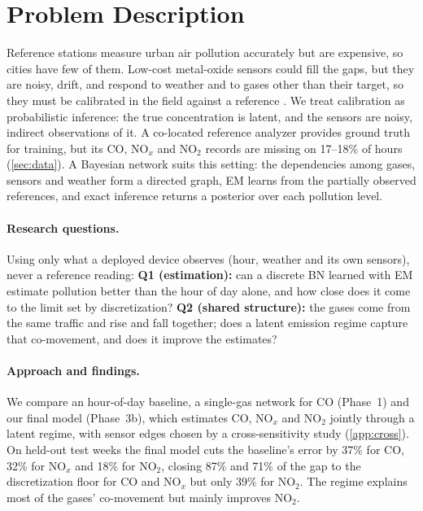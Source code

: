 \section{Problem Description}
\label{sec:problem}

Reference stations measure urban air pollution accurately but are expensive,
so cities have few of them. Low-cost metal-oxide sensors could fill the gaps,
but they are noisy, drift, and respond to weather and to gases other than their
target, so they must be calibrated in the field against a reference
\citep{devito2008calibration}. We treat calibration as probabilistic
inference: the true concentration is latent, and the sensors are noisy,
indirect observations of it. A co-located reference analyzer provides ground
truth for training, but its CO, NO$_x$ and NO$_2$ records are missing on
17--18\% of hours (\cref{sec:data}). A Bayesian network suits this setting:
the dependencies among gases, sensors and weather form a directed graph, EM
\citep{dempster1977em} learns from the partially observed references, and
exact inference returns a posterior over each pollution level.

\paragraph{Research questions.} Using only what a deployed device observes
(hour, weather and its own sensors), never a reference reading:
\textbf{Q1 (estimation):} can a discrete BN learned with EM estimate pollution
better than the hour of day alone, and how close does it come to the limit set
by discretization? \textbf{Q2 (shared structure):} the gases come from the
same traffic and rise and fall together; does a latent emission regime capture
that co-movement, and does it improve the estimates?

\paragraph{Approach and findings.} We compare an hour-of-day baseline, a
single-gas network for CO (Phase~1) and our final model (Phase~3b), which
estimates CO, NO$_x$ and NO$_2$ jointly through a latent regime, with sensor
edges chosen by a cross-sensitivity study (\cref{app:cross}). On held-out test
weeks the final model cuts the baseline's error by 37\% for CO, 32\% for
NO$_x$ and 18\% for NO$_2$, closing 87\% and 71\% of the gap to the
discretization floor for CO and NO$_x$ but only 39\% for NO$_2$. The regime
explains most of the gases' co-movement but mainly improves NO$_2$.